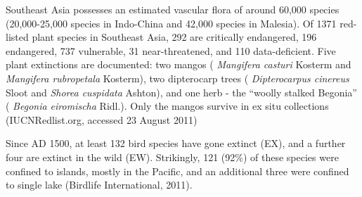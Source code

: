 \documentclass[
  ignorenonframetext,
  aspectratio=169]{beamer}
\begin{document}
\begin{frame}{}
\protect\hypertarget{section-4}{}
Southeast Asia possesses an estimated vascular flora of around 60,000
species (20,000-25,000 species in Indo-China and 42,000 species in
Malesia). Of 1371 red-listed plant species in Southeast Asia, 292 are
critically endangered, 196 endangered, 737 vulnerable, 31
near-threatened, and 110 data-deficient. Five plant extinctions are
documented: two mangos ( \emph{Mangifera casturi} Kosterm and
\emph{Mangifera rubropetala} Kosterm), two dipterocarp trees (
\emph{Dipterocarpus cinereus} Sloot and \emph{Shorea cuspidata} Ashton),
and one herb - the ``woolly stalked Begonia'' ( \emph{Begonia
eiromischa} Ridl.). Only the mangos survive in ex situ collections
(IUCNRedlist.org, accessed 23 August 2011)

Since AD 1500, at least 132 bird species have gone extinct (EX), and a
further four are extinct in the wild (EW). Strikingly, 121 (92\%) of
these species were confined to islands, mostly in the Pacific, and an
additional three were confined to single lake (Birdlife International,
2011).
\end{frame}
\end{document}
